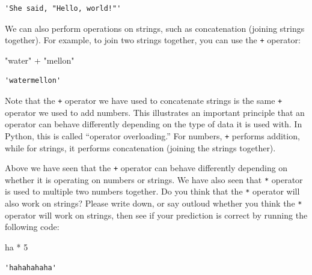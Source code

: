 \documentclass[
  letterpaper,
  DIV=11,
  numbers=noendperiod]{scrreprt}
\newenvironment{Shaded}{\begin{snugshade}}{\end{snugshade}}
\newcommand{\CommentTok}[1]{\textcolor[rgb]{0.37,0.37,0.37}{#1}}
\newcommand{\DecValTok}[1]{\textcolor[rgb]{0.68,0.00,0.00}{#1}}
\newcommand{\OperatorTok}[1]{\textcolor[rgb]{0.37,0.37,0.37}{#1}}
\newcommand{\StringTok}[1]{\textcolor[rgb]{0.13,0.47,0.30}{#1}}
\begin{document}
\begin{verbatim}
'She said, "Hello, world!"'
\end{verbatim}

We can also perform operations on strings, such as concatenation
(joining strings together). For example, to join two strings together,
you can use the \texttt{+} operator:

\begin{Shaded}
\begin{Highlighting}[]
\CommentTok{"water"} \OperatorTok{+} \StringTok{"mellon"}
\end{Highlighting}
\end{Shaded}

\begin{verbatim}
'watermellon'
\end{verbatim}

Note that the \texttt{+} operator we have used to concatenate strings is
the same \texttt{+} operator we used to add numbers. This illustrates an
important principle that an operator can behave differently depending on
the type of data it is used with. In Python, this is called ``operator
overloading.'' For numbers, \texttt{+} performs addition, while for
strings, it performs concatenation (joining the strings together).

\begin{tcolorbox}[enhanced jigsaw, toprule=.15mm, leftrule=.75mm, toptitle=1mm, title=\textcolor{quarto-callout-tip-color}{\faLightbulb}\hspace{0.5em}{Exercise}, left=2mm, coltitle=black, colframe=quarto-callout-tip-color-frame, colback=white, breakable, opacityback=0, titlerule=0mm, bottomtitle=1mm, bottomrule=.15mm, arc=.35mm, colbacktitle=quarto-callout-tip-color!10!white, rightrule=.15mm, opacitybacktitle=0.6]

Above we have seen that the \texttt{+} operator can behave differently
depending on whether it is operating on numbers or strings. We have also
seen that \texttt{*} operator is used to multiple two numbers together.
Do you think that the \texttt{*} operator will also work on strings?
Please write down, or say outloud whether you think the \texttt{*}
operator will work on strings, then see if your prediction is correct by
running the following code:

\begin{Shaded}
\begin{Highlighting}[]
\CommentTok{\textquotesingle{}ha\textquotesingle{}} \OperatorTok{*} \DecValTok{5}
\end{Highlighting}
\end{Shaded}

\begin{verbatim}
'hahahahaha'
\end{verbatim}

\end{tcolorbox}
\end{document}
